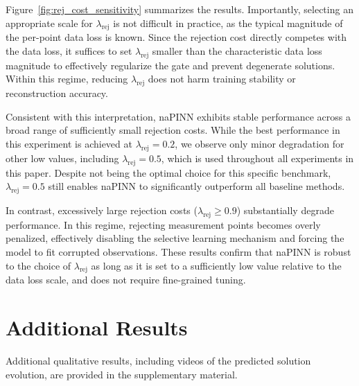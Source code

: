 \documentclass{article}
\theoremstyle{plain}
\theoremstyle{definition}
\theoremstyle{remark}
\begin{document}
Figure~\ref{fig:rej_cost_sensitivity} summarizes the results.
Importantly, selecting an appropriate scale for $\lambda_{\mathrm{rej}}$ is not difficult in practice, as the typical magnitude of the per-point data loss is known.
Since the rejection cost directly competes with the data loss, it suffices to set $\lambda_{\mathrm{rej}}$ smaller than the characteristic data loss magnitude to effectively regularize the gate and prevent degenerate solutions.
Within this regime, reducing $\lambda_{\mathrm{rej}}$ does not harm training stability or reconstruction accuracy.

Consistent with this interpretation, naPINN exhibits stable performance across a broad range of sufficiently small rejection costs.
While the best performance in this experiment is achieved at $\lambda_{\mathrm{rej}}=0.2$, we observe only minor degradation for other low values, including $\lambda_{\mathrm{rej}}=0.5$, which is used throughout all experiments in this paper.
Despite not being the optimal choice for this specific benchmark, $\lambda_{\mathrm{rej}}=0.5$ still enables naPINN to significantly outperform all baseline methods.

In contrast, excessively large rejection costs ($\lambda_{\mathrm{rej}} \ge 0.9$) substantially degrade performance.
In this regime, rejecting measurement points becomes overly penalized, effectively disabling the selective learning mechanism and forcing the model to fit corrupted observations.
These results confirm that naPINN is robust to the choice of $\lambda_{\mathrm{rej}}$ as long as it is set to a sufficiently low value relative to the data loss scale, and does not require fine-grained tuning.

\section{Additional Results}

Additional qualitative results, including videos of the predicted solution evolution, are provided in the supplementary material.

\end{document}
